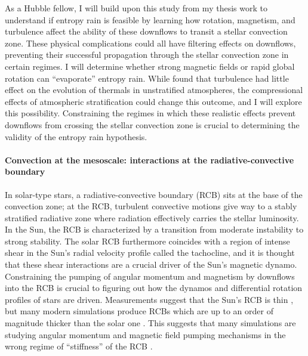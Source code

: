 \documentclass[preprint, hmargin=1in, vmargin=1in]{aastex62}
\begin{document}
As a Hubble fellow, I will build upon this study from my thesis work to understand if entropy rain is feasible by learning how rotation, magnetism, and turbulence affect the ability of these downflows to transit a stellar convection zone.
These physical complications could all have filtering effects on downflows, preventing their successful propagation through the stellar convection zone in certain regimes.
I will determine whether strong magnetic fields or rapid global rotation can ``evaporate'' entropy rain.
While \citet{lecoanet&jeevanjee2019} found that turbulence had little effect on the evolution of thermals in unstratified atmospheres, the compressional effects of atmospheric stratification could change this outcome, and I will explore this possibility.
Constraining the regimes in which these realistic effects prevent downflows from crossing the stellar convection zone is crucial to determining the validity of the entropy rain hypothesis.

\paragraph{Convection at the mesoscale: interactions at the radiative-convective boundary}
In solar-type stars, a radiative-convective boundary (RCB) sits at the base of the convection zone; at the RCB, turbulent convective motions give way to a stably stratified radiative zone where radiation effectively carries the stellar luminosity.
In the Sun, the RCB is characterized by a transition from moderate instability to strong stability.
The solar RCB furthermore coincides with a region of intense shear in the Sun's radial velocity profile called the tachocline, and it is thought that these shear interactions are a crucial driver of the Sun's magnetic dynamo.
Constraining the pumping of angular momentum and magnetism by downflows into the RCB is crucial to figuring out how the dynamos and differential rotation profiles of stars are driven.
Measurements suggest that the Sun's RCB is thin \citep{basu1997}, but many modern simulations produce RCBs which are up to an order of magnitude thicker than the solar one \citep{hotta2017}.
This suggests that many simulations are studying angular momentum and magnetic field pumping mechanisms in the wrong regime of ``stiffness'' of the RCB \citep{brummell&all2002, rogers&glatzmaier2005, couston&all2017}.
\end{document}
